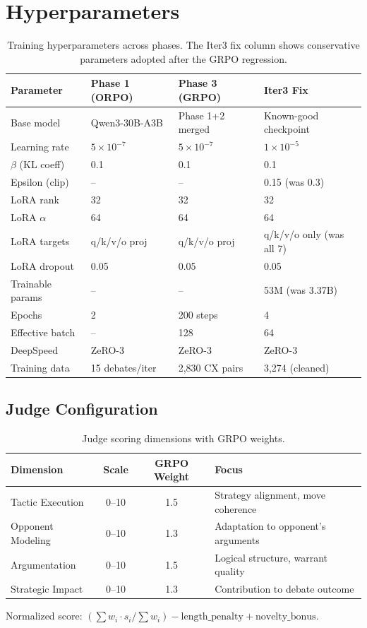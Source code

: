 \section{Hyperparameters}
\label{app:hyperparams}

\begin{table}[h]
\centering
\small
\begin{tabular}{llll}
\toprule
\textbf{Parameter} & \textbf{Phase 1 (ORPO)} & \textbf{Phase 3 (GRPO)} & \textbf{Iter3 Fix} \\
\midrule
Base model & Qwen3-30B-A3B & Phase 1+2 merged & Known-good checkpoint \\
Learning rate & $5 \times 10^{-7}$ & $5 \times 10^{-7}$ & $1 \times 10^{-5}$ \\
$\beta$ (KL coeff) & 0.1 & 0.1 & 0.1 \\
Epsilon (clip) & -- & -- & 0.15 (was 0.3) \\
LoRA rank & 32 & 32 & 32 \\
LoRA $\alpha$ & 64 & 64 & 64 \\
LoRA targets & q/k/v/o proj & q/k/v/o proj & q/k/v/o only (was all 7) \\
LoRA dropout & 0.05 & 0.05 & 0.05 \\
Trainable params & -- & -- & 53M (was 3.37B) \\
Epochs & 2 & 200 steps & 4 \\
Effective batch & -- & 128 & 64 \\
DeepSpeed & ZeRO-3 & ZeRO-3 & ZeRO-3 \\
Training data & 15 debates/iter & 2,830 CX pairs & 3,274 (cleaned) \\
\bottomrule
\end{tabular}
\caption{Training hyperparameters across phases. The Iter3 fix column shows
conservative parameters adopted after the GRPO regression.}
\end{table}

\subsection{Judge Configuration}

\begin{table}[h]
\centering
\small
\begin{tabular}{lccl}
\toprule
\textbf{Dimension} & \textbf{Scale} & \textbf{GRPO Weight} & \textbf{Focus} \\
\midrule
Tactic Execution & 0--10 & 1.5 & Strategy alignment, move coherence \\
Opponent Modeling & 0--10 & 1.3 & Adaptation to opponent's arguments \\
Argumentation & 0--10 & 1.5 & Logical structure, warrant quality \\
Strategic Impact & 0--10 & 1.3 & Contribution to debate outcome \\
\bottomrule
\end{tabular}
\caption{Judge scoring dimensions with GRPO weights.}
\end{table}

Normalized score: $(\sum w_i \cdot s_i / \sum w_i) - \text{length\_penalty} + \text{novelty\_bonus}$.
